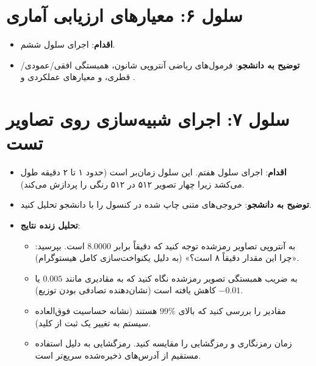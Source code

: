 \section{سلول ۶: معیارهای ارزیابی آماری}
\begin{itemize}
    \item \textbf{اقدام}: اجرای سلول ششم.
    \item \textbf{توضیح به دانشجو}: فرمول‌های ریاضی آنتروپی شانون، همبستگی افقی/عمودی/قطری، و معیارهای عملکردی  و .
\end{itemize}

\section{سلول ۷: اجرای شبیه‌سازی روی تصاویر تست}
\begin{itemize}
    \item \textbf{اقدام}: اجرای سلول هفتم. این سلول زمان‌بر است (حدود ۱ تا ۲ دقیقه طول می‌کشد زیرا چهار تصویر ۵۱۲ در ۵۱۲ رنگی را پردازش می‌کند).
    \item \textbf{توضیح به دانشجو}: خروجی‌های متنی چاپ شده در کنسول را با دانشجو تحلیل کنید.
    \item \textbf{تحلیل زنده نتایج}:
    \begin{itemize}
        \item به آنتروپی تصاویر رمزشده توجه کنید که دقیقاً برابر $8.0000$ است. بپرسید: «چرا این مقدار دقیقاً ۸ است؟» (به دلیل یکنواخت‌سازی کامل هیستوگرام).
        \item به ضریب همبستگی تصویر رمزشده نگاه کنید که به مقادیری مانند $0.005$ یا $-0.01$ کاهش یافته است (نشان‌دهنده تصادفی بودن توزیع).
        \item مقادیر  را بررسی کنید که بالای $99\%$ هستند (نشانه حساسیت فوق‌العاده سیستم به تغییر یک ثبت از کلید).
        \item زمان رمزنگاری و رمزگشایی را مقایسه کنید. رمزگشایی به دلیل استفاده مستقیم از آدرس‌های ذخیره‌شده سریع‌تر است.
    \end{itemize}
\end{itemize}

